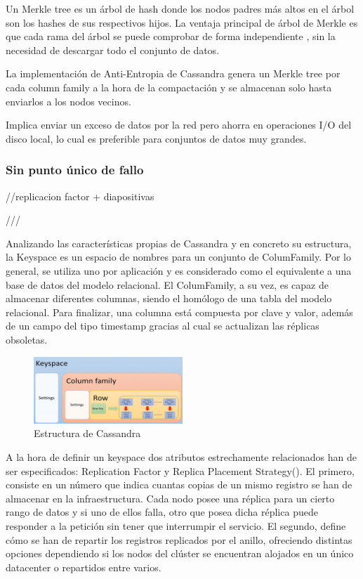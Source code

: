 Un Merkle tree es un árbol de hash donde los nodos padres más altos en el árbol son los hashes de sus respectivos hijos. La ventaja principal de árbol de Merkle es que cada rama del árbol se puede comprobar de forma independiente , sin la necesidad de descargar todo el conjunto de datos.

La implementación de Anti-Entropia de Cassandra genera un Merkle tree por cada column family a la hora de la compactación y se almacenan solo hasta enviarlos a los nodos vecinos. 

Implica enviar un exceso de datos por la red pero ahorra en operaciones I/O del disco local, lo cual es preferible para conjuntos de datos muy grandes.

\subsubsection{Sin punto único de fallo}

//replicacion factor + diapositivas

///

Analizando las características propias de Cassandra y en concreto su estructura, la Keyspace es un espacio de nombres para un conjunto de ColumFamily. Por lo general, se utiliza uno por aplicación y es considerado como el equivalente a una base de datos del modelo relacional. El ColumFamily, a su vez, es capaz de almacenar diferentes columnas, siendo el homólogo de una tabla del modelo relacional. Para finalizar, una columna está compuesta por clave y valor, además de un campo del tipo timestamp gracias al cual se actualizan las réplicas obsoletas.\\

\begin{figure}[h]
	\centering
	\includegraphics[width=0.5\textwidth]{Ilustraciones/cassandra_infraestructure.png}
	\caption{Estructura de Cassandra}
	\label{fig:cassandra_infraestructure}
\end{figure}

A la hora de definir un keyspace dos atributos estrechamente relacionados han de ser especificados: Replication Factor y Replica Placement Strategy(). El primero, consiste en un número que indica cuantas copias de un mismo registro se han de almacenar en la infraestructura. Cada nodo posee una réplica para un cierto rango de datos y si uno de ellos falla, otro que posea dicha réplica puede responder a la petición sin tener que interrumpir el servicio. El segundo, define cómo se han de repartir los registros replicados por el anillo, ofreciendo distintas opciones dependiendo si los nodos del clúster se encuentran alojados en un único datacenter o repartidos entre varios.\\

